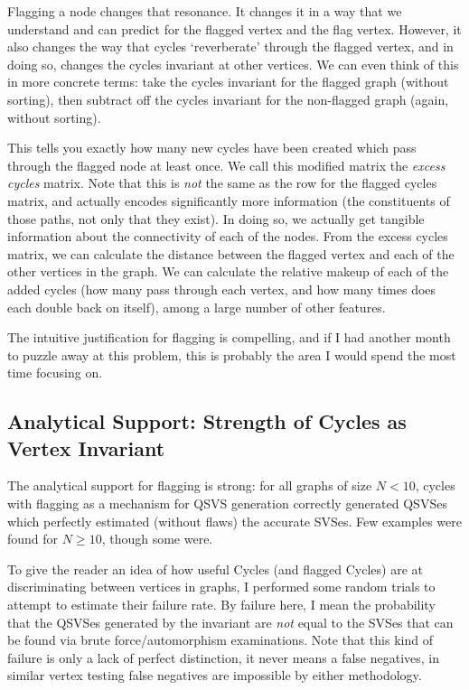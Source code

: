 Flagging a node changes that resonance.
It changes it in a way that we understand and can predict for the flagged vertex and the flag vertex.
However, it also changes the way that cycles `reverberate' through the flagged vertex, and in doing so, changes the cycles invariant at other vertices.
We can even think of this in more concrete terms: take the cycles invariant for the flagged graph (without sorting), then subtract off the cycles invariant for the non-flagged graph (again, without sorting).

This tells you exactly how many new cycles have been created which pass through the flagged node at least once.
We call this modified matrix the \emph{excess cycles} matrix.
Note that this is \emph{not} the same as the row for the flagged cycles matrix, and actually encodes significantly more information (the constituents of those paths, not only that they exist).
In doing so, we actually get tangible information about the connectivity of each of the nodes.
From the excess cycles matrix, we can calculate the distance between the flagged vertex and each of the other vertices in the graph.
We can calculate the relative makeup of each of the added cycles (how many pass through each vertex, and how many times does each double back on itself), among a large number of other features.

The intuitive justification for flagging is compelling, and if I had another month to puzzle away at this problem, this is probably the area I would spend the most time focusing on.

\subsection{Analytical Support: Strength of Cycles as Vertex Invariant}

The analytical support for flagging is strong:
for all graphs of size $N < 10$, cycles with flagging as a mechanism for QSVS generation correctly generated QSVSes which perfectly estimated (without flaws) the accurate SVSes.
Few examples were found for $N \geq 10$, though some were.

To give the reader an idea of how useful Cycles (and flagged Cycles) are at discriminating between vertices in graphs, I performed some random trials to attempt to estimate their failure rate.
By failure here, I mean the probability that the QSVSes generated by the invariant are \emph{not} equal to the SVSes that can be found via brute force/automorphism examinations.
Note that this kind of failure is only a lack of perfect distinction, it never means a false negatives, in similar vertex testing false negatives are impossible by either methodology.


